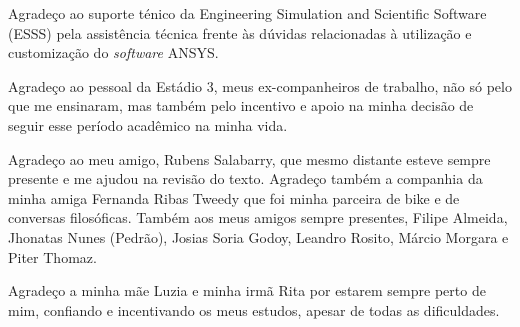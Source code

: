 Agradeço ao suporte ténico da Engineering Simulation and Scientific Software (ESSS) pela assistência técnica frente às dúvidas relacionadas à utilização e customização do \textit{software} ANSYS.

Agradeço ao pessoal da Estádio 3, meus ex-companheiros de trabalho, não só pelo que me ensinaram, mas também pelo incentivo e apoio na minha decisão de seguir esse período acadêmico na minha vida.

Agradeço ao meu amigo, Rubens Salabarry, que mesmo distante esteve sempre presente e me ajudou na revisão do texto. Agradeço também a companhia da minha amiga Fernanda Ribas Tweedy que foi minha parceira de bike e de conversas filosóficas. Também aos meus amigos sempre presentes, Filipe Almeida, Jhonatas Nunes (Pedrão), Josias Soria Godoy, Leandro Rosito, Márcio Morgara e Piter Thomaz. 

Agradeço a minha mãe Luzia e minha irmã Rita por estarem sempre perto de mim, confiando e incentivando os meus estudos, apesar de todas as dificuldades.